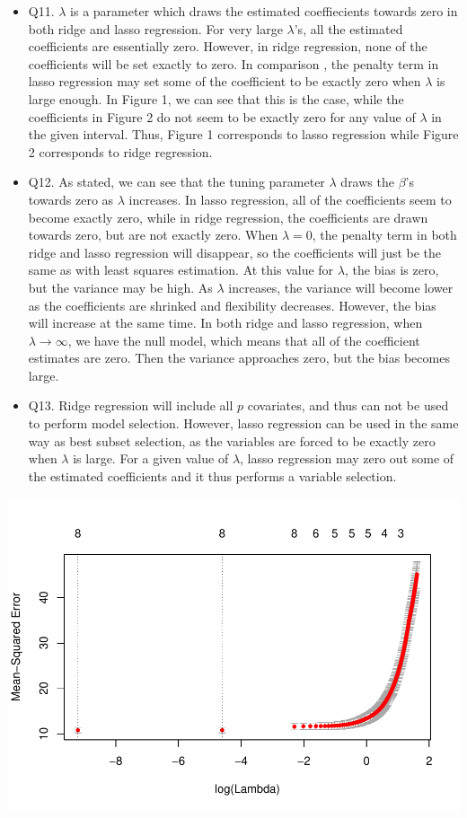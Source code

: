 \documentclass[]{article}
\begin{document}
\begin{itemize}
\item
  Q11. \(\lambda\) is a parameter which draws the estimated
  coeffiecients towards zero in both ridge and lasso regression. For
  very large \(\lambda\)'s, all the estimated coefficients are
  essentially zero. However, in ridge regression, none of the
  coefficients will be set exactly to zero. In comparison , the penalty
  term in lasso regression may set some of the coefficient to be exactly
  zero when \(\lambda\) is large enough. In Figure 1, we can see that
  this is the case, while the coefficients in Figure 2 do not seem to be
  exactly zero for any value of \(\lambda\) in the given interval. Thus,
  Figure 1 corresponds to lasso regression while Figure 2 corresponds to
  ridge regression.
\item
  Q12. As stated, we can see that the tuning parameter \(\lambda\) draws
  the \(\beta\)'s towards zero as \(\lambda\) increases. In lasso
  regression, all of the coefficients seem to become exactly zero, while
  in ridge regression, the coefficients are drawn towards zero, but are
  not exactly zero. When \(\lambda=0\), the penalty term in both ridge
  and lasso regression will disappear, so the coefficients will just be
  the same as with least squares estimation. At this value for
  \(\lambda\), the bias is zero, but the variance may be high. As
  \(\lambda\) increases, the variance will become lower as the
  coefficients are shrinked and flexibility decreases. However, the bias
  will increase at the same time. In both ridge and lasso regression,
  when \(\lambda \rightarrow \infty\), we have the null model, which
  means that all of the coefficient estimates are zero. Then the
  variance approaches zero, but the bias becomes large.
\item
  Q13. Ridge regression will include all \(p\) covariates, and thus can
  not be used to perform model selection. However, lasso regression can
  be used in the same way as best subset selection, as the variables are
  forced to be exactly zero when \(\lambda\) is large. For a given value
  of \(\lambda\), lasso regression may zero out some of the estimated
  coefficients and it thus performs a variable selection.
\end{itemize}

\includegraphics{Project2_files/figure-latex/unnamed-chunk-5-1.pdf}
\end{document}
